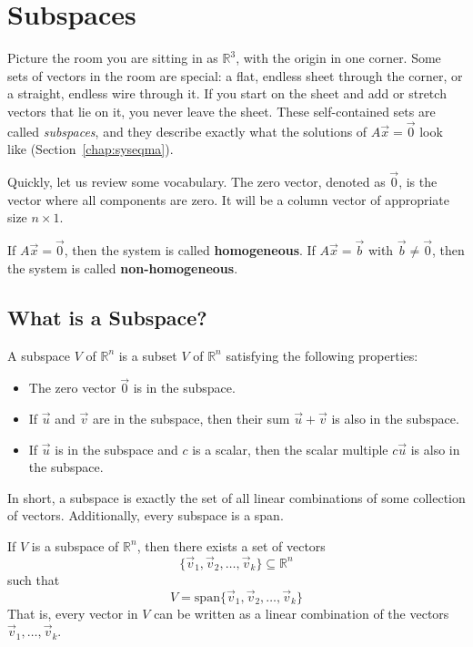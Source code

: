 \chapter{Subspaces}\label{chap:subspaces}
Picture the room you are sitting in as $\mathbb{R}^3$, with the origin in
one corner. Some sets of vectors in the room are special: a flat, endless
sheet through the corner, or a straight, endless wire through it. If you
start on the sheet and add or stretch vectors that lie on it, you never
leave the sheet. These self-contained sets are called \emph{subspaces}, and
they describe exactly what the solutions of $A\vec{x}=\vec{0}$ look like
(Section~\ref{chap:syseqma}).

Quickly, let us review some vocabulary. 
The zero vector, denoted as $\vec{0}$, is the vector where all components are zero. It will be a column vector of appropriate size $n\times 1$.

If $A\vec{x} = \vec{0}$, then the system is called \textbf{homogeneous}. If $A\vec{x} = \vec{b}$ with $\vec{b} \neq \vec{0}$, then the system is called \textbf{non-homogeneous}.

\section{What is a Subspace?}
A subspace $V$ of $\mathbb{R}^n$ is a subset $V$ of $\mathbb{R}^n$ satisfying the following properties:
\begin{itemize}
    \item The zero vector $\vec{0}$ is in the subspace.
    \item If $\vec{u}$ and $\vec{v}$ are in the subspace, then their sum $\vec{u} + \vec{v}$ is also in the subspace.
    \item If $\vec{u}$ is in the subspace and $c$ is a scalar, then the scalar multiple $c\vec{u}$ is also in the subspace.
\end{itemize}

In short, a subspace is exactly the set of all linear combinations of some collection of vectors. Additionally, every subspace is a span. 
\begin{mdframed}[frametitle = {Subspace Span}, style = important]
If $V$ is a subspace of $\mathbb{R}^n$, then there exists a set of vectors
$$\{\vec{v}_1,\vec{v}_2,\ldots,\vec{v}_k\} \subseteq \mathbb{R}^n$$
such that
$$V = \text{span}\{\vec{v}_1,\vec{v}_2,\ldots,\vec{v}_k\}$$
That is, every vector in $V$ can be written as a linear combination of the vectors $\vec{v}_1,\ldots,\vec{v}_k$.
\end{mdframed}

